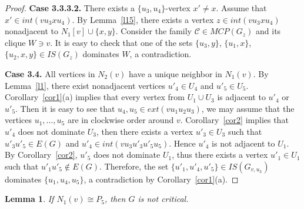\documentclass[12pt]{article}
\newtheorem{lemma}{Lemma}
\begin{document}
\begin{proof}
\textbf{Case 3.3.3.2.} There exists a $\{u_3,u_4\}$-vertex $x' \neq x$. Assume that $x' \in int(vu_3xu_4)$. By Lemma~\ref{l15}, there exists a vertex $z \in int(vu_3xu_4)$ nonadjacent to $N_1[v] \cup \{x,y\}$. Consider the family $\mathcal{C} \in MCP(G_z)$ and its clique $W \ni v$. It is easy to check that one of the sets $\{u_3,y\}$, $\{u_1,x\}$, $\{u_2,x,y\} \in IS(G_z)$ dominates $W$, a contradiction.

\textbf{Case 3.4.} All vertices in $N_2(v)$ have a unique neighbor in $N_1(v)$. By Lemma~\ref{l1}, there exist nonadjacent vertices $u'_4 \in U_4$ and $u'_5 \in U_5$. Corollary~\ref{cor1}(a) implies that every vertex from $U_1 \cup U_3$ is adjacent to $u'_4$ or $u'_5$. Then it is easy to see that $u_4,u_5 \in ext(vu_1u_2u_3)$, we may assume that the vertices $u_1,\ldots,u_5$ are in clockwise order around $v$. Corollary~\ref{cor2} implies that $u'_4$ does not dominate $U_3$, then there exists a vertex $u'_3 \in U_3$ such that $u'_3u'_5 \in E(G)$ and $u'_4 \in int(vu_3u'_3u'_5u_5)$. Hence $u'_4$ is not adjacent to $U_1$. By Corollary~\ref{cor2}, $u'_5$ does not dominate $U_1$, thus there exists a vertex $u'_1 \in U_1$ such that $u'_1u'_5 \notin E(G)$. Therefore, the set $\{u'_1,u'_4,u'_5\} \in IS(G_{v,u_3})$ dominates $\{u_1,u_4,u_5\}$, a contradiction by Corollary~\ref{cor1}(a).
\end{proof}

\begin{lemma}\label{l39}
If  $N_1(v) \cong P_5$, then $G$ is not critical.
\end{lemma}
\end{document}
